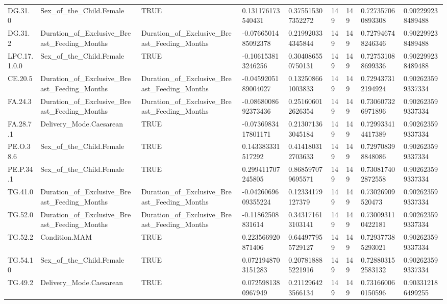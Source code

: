 \begin{longtable}{lllllllll}
DG.31.0 & Sex\_of\_the\_Child.Female & TRUE & 0.131176173540431 & 0.375515307352272 & 149 & 149 & 0.727357060893308 & 0.902299238489488 \\
DG.31.2 & Duration\_of\_Exclusive\_Breast\_Feeding\_Months & Duration\_of\_Exclusive\_Breast\_Feeding\_Months & -0.0766501485092378 & 0.219920334345844 & 149 & 149 & 0.727946748246346 & 0.902299238489488 \\
LPC.17.1.0.0 & Sex\_of\_the\_Child.Female & TRUE & -0.106153813246256 & 0.304086550750131 & 149 & 149 & 0.727531088699336 & 0.902299238489488 \\
CE.20.5 & Duration\_of\_Exclusive\_Breast\_Feeding\_Months & Duration\_of\_Exclusive\_Breast\_Feeding\_Months & -0.0459205189004027 & 0.132508661003833 & 149 & 149 & 0.729437312194924 & 0.902623599337334 \\
FA.24.3 & Duration\_of\_Exclusive\_Breast\_Feeding\_Months & Duration\_of\_Exclusive\_Breast\_Feeding\_Months & -0.0868008692373436 & 0.251606012626354 & 149 & 149 & 0.730607326971896 & 0.902623599337334 \\
FA.28.7.1 & Delivery\_Mode.Caesarean & TRUE & -0.0736983417801171 & 0.213071363045184 & 149 & 149 & 0.729933414417389 & 0.902623599337334 \\
PE.O.38.6 & Sex\_of\_the\_Child.Female & TRUE & 0.143383331517292 & 0.414180312703633 & 149 & 149 & 0.729708398848086 & 0.902623599337334 \\
PE.P.34.1 & Sex\_of\_the\_Child.Female & TRUE & 0.299411707245805 & 0.868597079695571 & 149 & 149 & 0.730817402872558 & 0.902623599337334 \\
TG.41.0 & Duration\_of\_Exclusive\_Breast\_Feeding\_Months & Duration\_of\_Exclusive\_Breast\_Feeding\_Months & -0.0426069609355224 & 0.12334179127379 & 149 & 149 & 0.73026909520473 & 0.902623599337334 \\
TG.52.0 & Duration\_of\_Exclusive\_Breast\_Feeding\_Months & Duration\_of\_Exclusive\_Breast\_Feeding\_Months & -0.11862508831614 & 0.343171613103141 & 149 & 149 & 0.730093110422181 & 0.902623599337334 \\
TG.52.2 & Condition.MAM & TRUE & 0.223566920871406 & 0.644977955729127 & 149 & 149 & 0.729377385293021 & 0.902623599337334 \\
TG.54.10 & Sex\_of\_the\_Child.Female & TRUE & 0.0721948703151283 & 0.207818885221916 & 149 & 149 & 0.728803152583132 & 0.902623599337334 \\
TG.49.2 & Delivery\_Mode.Caesarean & TRUE & 0.0725981380967949 & 0.211296423566134 & 149 & 149 & 0.731660060150596 & 0.903312186499255 \\

\end{longtable}
